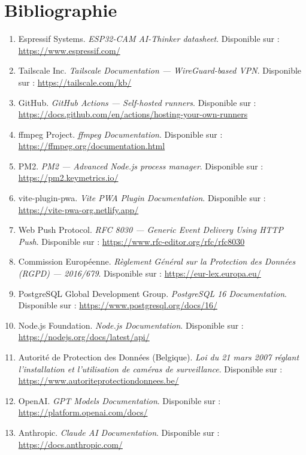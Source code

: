 \documentclass[12pt,a4paper]{article}
\begin{document}
\section{Bibliographie}

\begin{enumerate}
    \item Espressif Systems. \textit{ESP32-CAM AI-Thinker datasheet}. Disponible sur : \url{https://www.espressif.com/}
    \item Tailscale Inc. \textit{Tailscale Documentation --- WireGuard-based VPN}. Disponible sur : \url{https://tailscale.com/kb/}
    \item GitHub. \textit{GitHub Actions --- Self-hosted runners}. Disponible sur : \url{https://docs.github.com/en/actions/hosting-your-own-runners}
    \item ffmpeg Project. \textit{ffmpeg Documentation}. Disponible sur : \url{https://ffmpeg.org/documentation.html}
    \item PM2. \textit{PM2 --- Advanced Node.js process manager}. Disponible sur : \url{https://pm2.keymetrics.io/}
    \item vite-plugin-pwa. \textit{Vite PWA Plugin Documentation}. Disponible sur : \url{https://vite-pwa-org.netlify.app/}
    \item Web Push Protocol. \textit{RFC 8030 --- Generic Event Delivery Using HTTP Push}. Disponible sur : \url{https://www.rfc-editor.org/rfc/rfc8030}
    \item Commission Européenne. \textit{Règlement Général sur la Protection des Données (RGPD) --- 2016/679}. Disponible sur : \url{https://eur-lex.europa.eu/}
    \item PostgreSQL Global Development Group. \textit{PostgreSQL 16 Documentation}. Disponible sur : \url{https://www.postgresql.org/docs/16/}
    \item Node.js Foundation. \textit{Node.js Documentation}. Disponible sur : \url{https://nodejs.org/docs/latest/api/}
    \item Autorité de Protection des Données (Belgique). \textit{Loi du 21 mars 2007 réglant l'installation et l'utilisation de caméras de surveillance}. Disponible sur : \url{https://www.autoriteprotectiondonnees.be/}
    \item OpenAI. \textit{GPT Models Documentation}. Disponible sur : \url{https://platform.openai.com/docs/}
    \item Anthropic. \textit{Claude AI Documentation}. Disponible sur : \url{https://docs.anthropic.com/}

\end{enumerate}
\end{document}
